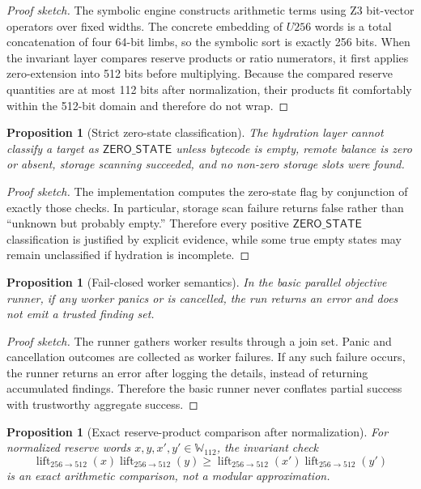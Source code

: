 \documentclass[11pt]{article}
\numberwithin{equation}{section}
\newtheorem{proposition}[definition]{Proposition}
\theoremstyle{remark}
\newcommand{\Words}[1]{\mathbb{W}_{#1}}
\newcommand{\Lift}[2]{\operatorname{lift}_{#1 \rightarrow #2}}
\newcommand{\ZeroState}{\mathsf{ZERO\_STATE}}
\begin{document}
\begin{proof}[Proof sketch]
The symbolic engine constructs arithmetic terms using Z3 bit-vector operators over fixed widths. The concrete embedding of \(U256\) words is a total concatenation of four 64-bit limbs, so the symbolic sort is exactly 256 bits. When the invariant layer compares reserve products or ratio numerators, it first applies zero-extension into 512 bits before multiplying. Because the compared reserve quantities are at most 112 bits after normalization, their products fit comfortably within the 512-bit domain and therefore do not wrap.
\end{proof}

\begin{proposition}[Strict zero-state classification]
\label{prop:zero-state}
The hydration layer cannot classify a target as \(\ZeroState\) unless bytecode is empty, remote balance is zero or absent, storage scanning succeeded, and no non-zero storage slots were found.
\end{proposition}

\begin{proof}[Proof sketch]
The implementation computes the zero-state flag by conjunction of exactly those checks. In particular, storage scan failure returns false rather than ``unknown but probably empty.'' Therefore every positive \(\ZeroState\) classification is justified by explicit evidence, while some true empty states may remain unclassified if hydration is incomplete.
\end{proof}

\begin{proposition}[Fail-closed worker semantics]
\label{prop:fail-closed-workers}
In the basic parallel objective runner, if any worker panics or is cancelled, the run returns an error and does not emit a trusted finding set.
\end{proposition}

\begin{proof}[Proof sketch]
The runner gathers worker results through a join set. Panic and cancellation outcomes are collected as worker failures. If any such failure occurs, the runner returns an error after logging the details, instead of returning accumulated findings. Therefore the basic runner never conflates partial success with trustworthy aggregate success.
\end{proof}

\begin{proposition}[Exact reserve-product comparison after normalization]
\label{prop:k-exact}
For normalized reserve words \(x,y,x',y' \in \Words{112}\), the invariant check
\[
\Lift{256}{512}(x)\Lift{256}{512}(y)
\ge
\Lift{256}{512}(x')\Lift{256}{512}(y')
\]
is an exact arithmetic comparison, not a modular approximation.
\end{proposition}
\end{document}
